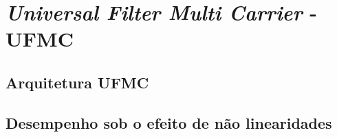 \chapter{\textit{Universal Filter Multi Carrier} - UFMC} \label{capitulo4}
 
\section{Arquitetura UFMC}



\section{Desempenho sob o efeito de não linearidades }